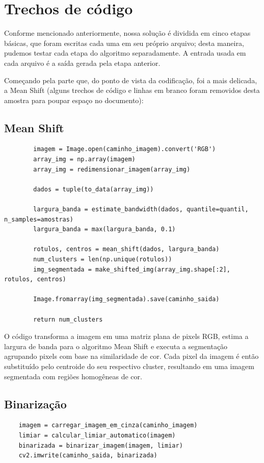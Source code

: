 \documentclass{article}
\begin{document}
\section{Trechos de código}

Conforme mencionado anteriormente, nossa solução é dividida em cinco etapas básicas, que foram escritas cada uma em seu próprio arquivo; desta maneira, pudemos testar cada etapa do algoritmo separadamente. A entrada usada em cada arquivo é a saída gerada pela etapa anterior.

Começando pela parte que, do ponto de vista da codificação, foi a mais delicada, a Mean Shift (alguns trechos de código e linhas em branco foram removidos desta amostra para poupar espaço no documento):

\subsection{Mean Shift}

\begin{verbatim}
        imagem = Image.open(caminho_imagem).convert('RGB')
        array_img = np.array(imagem)
        array_img = redimensionar_imagem(array_img)

        dados = tuple(to_data(array_img))

        largura_banda = estimate_bandwidth(dados, quantile=quantil, n_samples=amostras)
        largura_banda = max(largura_banda, 0.1)

        rotulos, centros = mean_shift(dados, largura_banda)
        num_clusters = len(np.unique(rotulos))
        img_segmentada = make_shifted_img(array_img.shape[:2], rotulos, centros)

        Image.fromarray(img_segmentada).save(caminho_saida)

        return num_clusters
\end{verbatim}

O código transforma a imagem em uma matriz plana de pixels RGB, estima a largura de banda para o algoritmo Mean Shift e executa a segmentação agrupando pixels com base na similaridade de cor. Cada pixel da imagem é então substituído pelo centroide do seu respectivo cluster, resultando em uma imagem segmentada com regiões homogêneas de cor.

\subsection{Binarização}

\begin{verbatim}
    imagem = carregar_imagem_em_cinza(caminho_imagem)
    limiar = calcular_limiar_automatico(imagem)
    binarizada = binarizar_imagem(imagem, limiar)
    cv2.imwrite(caminho_saida, binarizada)
\end{verbatim}
\end{document}
